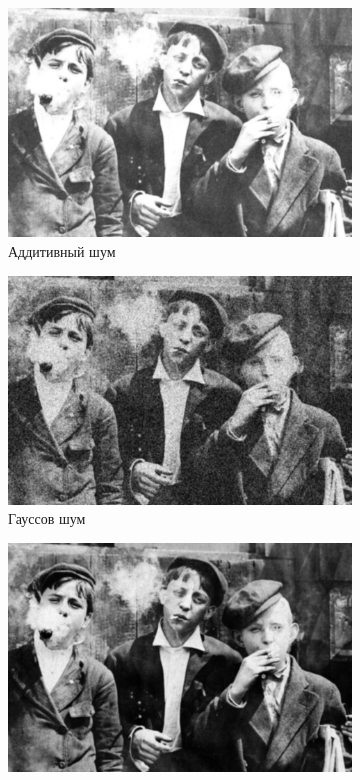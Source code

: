 \begin{figure}[ht!]
\begin{subfigure}[b]{0.5\linewidth}
      \includegraphics[width=0.95\linewidth]{../Gaussian_Blur/Gaussian_Blur_Additive_noise_(7,7).jpg} 
      \caption{Аддитивный шум} 
      \label{gaussian_7:c} 
      \vspace{4ex}
    \end{subfigure}%
    \begin{subfigure}[b]{0.5\linewidth}
      \centering
      \includegraphics[width=0.95\linewidth]{../Gaussian_Blur/Gaussian_Blur_Gaussian_noise_(7,7).jpg} 
      \caption{Гауссов шум} 
      \label{gaussian_7:d} 
      \vspace{4ex}
    \end{subfigure}
    \begin{subfigure}[b]{0.5\linewidth}
      \centering
      \includegraphics[width=0.95\linewidth]{../Gaussian_Blur/Gaussian_Blur_Poisson_noise_(7,7).jpg} 

\end{subfigure}
\end{figure}

